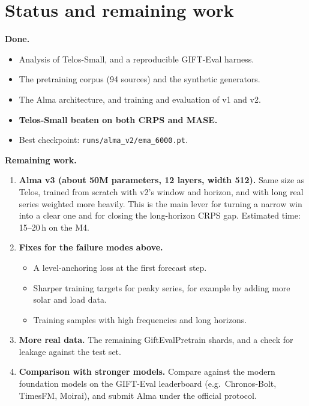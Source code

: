 \documentclass[10pt,twocolumn]{extarticle}
\begin{document}
\section{Status and remaining work}
\textbf{Done.}
\begin{itemize}
\item Analysis of Telos-Small, and a reproducible GIFT-Eval harness.
\item The pretraining corpus (94 sources) and the synthetic generators.
\item The Alma architecture, and training and evaluation of v1 and v2.
\item \textbf{Telos-Small beaten on both CRPS and MASE.}
\item Best checkpoint: \texttt{runs/alma\_v2/ema\_6000.pt}.
\end{itemize}
\textbf{Remaining work.}
\begin{enumerate}
\item \textbf{Alma v3 (about 50M parameters, 12 layers, width 512).} Same size as
Telos, trained from scratch with v2's window and horizon, and with long real series
weighted more heavily. This is the main lever for turning a narrow win into a clear
one and for closing the long-horizon CRPS gap. Estimated time: 15--20\,h on the M4.
\item \textbf{Fixes for the failure modes above.}
\begin{itemize}
\item A level-anchoring loss at the first forecast step.
\item Sharper training targets for peaky series, for example by adding more solar
and load data.
\item Training samples with high frequencies and long horizons.
\end{itemize}
\item \textbf{More real data.} The remaining GiftEvalPretrain shards, and a check
for leakage against the test set.
\item \textbf{Comparison with stronger models.} Compare against the modern
foundation models on the GIFT-Eval leaderboard (e.g.\ Chronos-Bolt, TimesFM,
Moirai), and submit Alma under the official protocol.
\end{enumerate}

\balance
\end{document}
